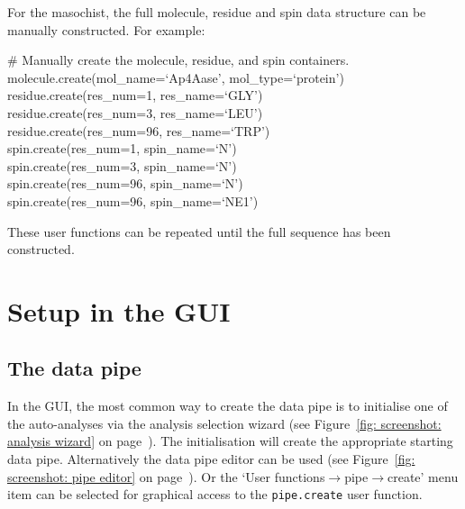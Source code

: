 For the masochist, the full molecule, residue and spin data structure can be manually constructed.  For example:

\begin{exampleenv}
\# Manually create the molecule, residue, and spin containers. \\
molecule.create(mol\_name=`Ap4Aase', mol\_type=`protein') \\
residue.create(res\_num=1,  res\_name=`GLY') \\
residue.create(res\_num=3,  res\_name=`LEU') \\
residue.create(res\_num=96, res\_name=`TRP') \\
spin.create(res\_num=1,  spin\_name=`N') \\
spin.create(res\_num=3,  spin\_name=`N') \\
spin.create(res\_num=96, spin\_name=`N') \\
spin.create(res\_num=96, spin\_name=`NE1')
\end{exampleenv}

These user functions can be repeated until the full sequence has been constructed.




\section{Setup in the GUI}



\subsection{The data pipe} \label{sect: GUI - data pipe}

In the GUI, the most common way to create the data pipe is to initialise one of the auto-analyses via the analysis selection wizard (see Figure~\ref{fig: screenshot: analysis wizard} on page~\pageref{fig: screenshot: analysis wizard}).  The initialisation will create the appropriate starting data pipe.  Alternatively the data pipe editor can be used (see Figure~\ref{fig: screenshot: pipe editor} on page~\pageref{fig: screenshot: pipe editor}).  Or the `User functions$\to$pipe$\to$create' menu item can be selected for graphical access to the \texttt{pipe.create} user function.




